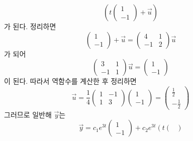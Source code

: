 \documentclass[../engineering_mathematics_lecture_note.tex]{subfiles}
\begin{document}
\begin{enumerate}
\begin{equation*}
            \left( t \begin{pmatrix}
                1 \\ -1
        \end{pmatrix} + \vec u \right)
        \end{equation*}
        가 된다.
        정리하면
        \begin{equation*}
            \begin{pmatrix}
                1 \\ -1
                \end{pmatrix}+ \vec u = \begin{pmatrix}
                4 & 1 \\
                -1 & 2
            \end{pmatrix} \vec u
        \end{equation*}
        가 되어
        \begin{equation*}
            \begin{pmatrix}
                3 & 1\\
                -1 & 1
            \end{pmatrix} \vec u = \begin{pmatrix}
                1 \\ -1
            \end{pmatrix}
        \end{equation*}
        이 된다.
        따라서 역함수를 계산한 후 정리하면
        \begin{equation*}
            \vec u = \frac14 \begin{pmatrix}
                1 & -1\\
                1 & 3
            \end{pmatrix} \begin{pmatrix}
                1 \\ -1
            \end{pmatrix} = \begin{pmatrix}
            \frac12 \\ -\frac12
            \end{pmatrix}
        \end{equation*}
        그러므로 일반해 $\vec y$는
        \begin{equation*}
            \vec y = c_1 e^{3t} \begin{pmatrix}
                1 \\ -1
            \end{pmatrix} + c_2 e^{3t} \left( t \begin{pmatrix}

\end{pmatrix}
\end{equation*}
\end{enumerate}
\end{document}
